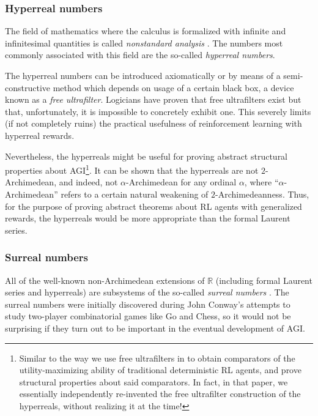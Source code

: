 \documentclass[twoside,11pt]{article}
\begin{document}
\subsubsection{Hyperreal numbers}

The field of mathematics where the calculus is formalized with infinite and infinitesimal
quantities is called \emph{nonstandard analysis} \citep{robinson}. The numbers most
commonly associated with this field are the so-called \emph{hyperreal numbers}.

The hyperreal numbers can be
introduced axiomatically or by means of a semi-constructive method which depends on
usage of a certain black box, a device known as a \emph{free ultrafilter}. Logicians
have proven that free ultrafilters exist but that, unfortunately, it is impossible to
concretely exhibit one. This severely limits (if not completely ruins) the practical
usefulness of reinforcement learning with hyperreal rewards.

Nevertheless, the hyperreals
might be useful for proving abstract structural properties about AGI\footnote{Similar to
the way we use free ultrafilters in \citep{alexander2019intelligence} to obtain
comparators of the utility-maximizing ability of traditional deterministic RL agents,
and prove structural properties about said comparators.
In fact, in that paper, we essentially independently re-invented the free ultrafilter
construction of the hyperreals, without realizing it at the time!}.
It can be shown that the hyperreals are not $2$-Archimedean, and indeed, not
$\alpha$-Archimedean for any ordinal $\alpha$, where ``$\alpha$-Archimedean'' refers to a
certain natural weakening of $2$-Archimedeanness. Thus, for the purpose of
proving abstract theorems about RL agents with generalized rewards, the hyperreals
would be more appropriate than the formal Laurent series.


\subsubsection{Surreal numbers}

All of the
well-known non-Archimedean extensions of $\mathbb R$
(including formal Laurent series and hyperreals) are subsystems of the
so-called \emph{surreal numbers}
\citep{conway, knuth, ehrlich2012absolute}. The surreal
numbers were initially discovered during John Conway's attempts to study
two-player combinatorial games like Go and Chess, so it would not be
surprising if they turn out to be important in the eventual development of
AGI.
\end{document}
